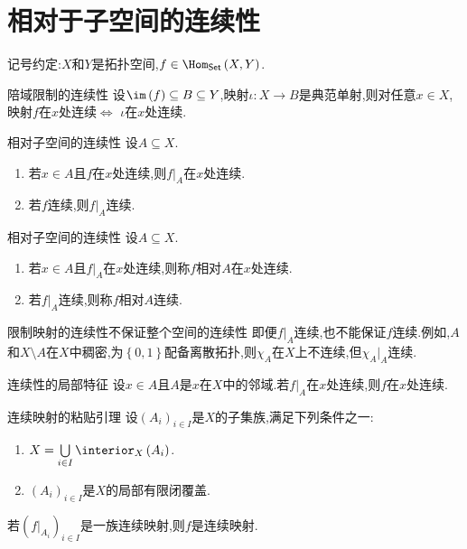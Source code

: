 \section{相对于子空间的连续性}

记号约定:$X$和$Y$是拓扑空间,$f\in\Hom_{\mathsf{Set}}\left(X,Y\right)$.

\begin{proposition}{陪域限制的连续性}{}
	设$\im\left(f\right)\subseteq B\subseteq Y$,映射$\iota:X\to B$是典范单射,则对任意$x\in X$,映射$f$在$x$处连续$\iff$ $\iota$在$x$处连续.
\end{proposition}

\begin{proposition}{相对子空间的连续性}{}
	设$A\subseteq X$.
	\begin{enumerate}
		\item 若$x\in A$且$f$在$x$处连续,则$f|_{A}$在$x$处连续.
		\item 若$f$连续,则$f|_{A}$连续.
	\end{enumerate}
\end{proposition}

\begin{definition}{相对子空间的连续性}{}
	设$A\subseteq X$.
	\begin{enumerate}
		\item 若$x\in A$且$f|_{A}$在$x$处连续,则称$f$相对$A$在$x$处连续.
		\item 若$f|_{A}$连续,则称$f$相对$A$连续.
	\end{enumerate}
\end{definition}

\begin{remark}{限制映射的连续性不保证整个空间的连续性}{}
	即便$f|_{A}$连续,也不能保证$f$连续.例如,$A$和$X\setminus A$在$X$中稠密,为$\left\{0,1\right\}$配备离散拓扑,则$\chi_{A}$在$X$上不连续,但$\chi_{A}|_{A}$连续.
\end{remark}

\begin{proposition}{连续性的局部特征}{}
	设$x\in A$且$A$是$x$在$X$中的邻域.若$f|_{A}$在$x$处连续,则$f$在$x$处连续.
\end{proposition}

\begin{proposition}{连续映射的粘贴引理}{}
	设$\left(A_{i}\right)_{i\in I}$是$X$的子集族,满足下列条件之一:
	\begin{enumerate}
		\item $X=\bigcup\limits_{i\in I}\interior_{X}\left(A_{i}\right)$.
		\item $\left(A_{i}\right)_{i\in I}$是$X$的局部有限闭覆盖.
	\end{enumerate}
	若$\left(f|_{A_{i}}\right)_{i\in I}$是一族连续映射,则$f$是连续映射.
\end{proposition}














